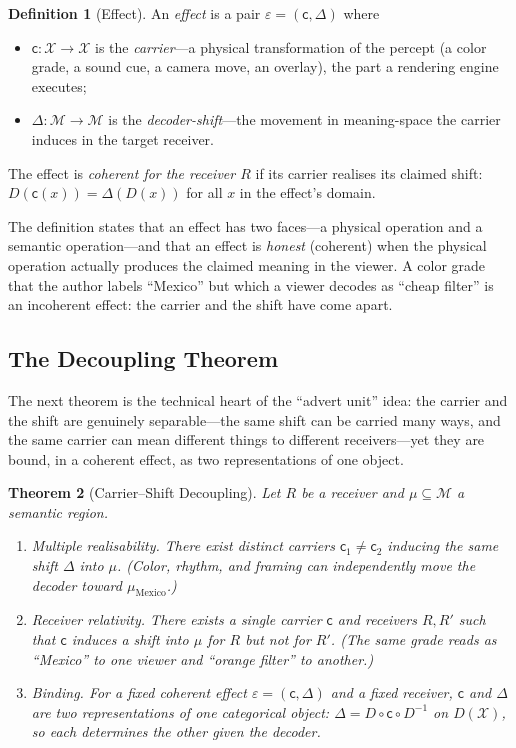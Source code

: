 \documentclass[twocolumn,11pt,a4paper]{article}
\theoremstyle{adv}
\newtheorem{theorem}{Theorem}[section]
\theoremstyle{definition}
\newtheorem{definition}[theorem]{Definition}
\theoremstyle{remark}
\newcommand{\Out}{\mathcal{X}}         %
\newcommand{\Dec}{D}                   %
\newcommand{\Recv}{R}                  %
\newcommand{\Eff}{\varepsilon}        %
\newcommand{\Carrier}{\kappa}         %
\renewcommand{\Carrier}{\mathsf{c}}
\newcommand{\Mean}{\mathcal{M}}        %
\newcommand{\shift}{\Delta}            %
\begin{document}
\begin{definition}[Effect]
\label{def:effect}
An \emph{effect} is a pair $\Eff=(\Carrier,\shift)$ where
\begin{itemize}[leftmargin=1.4em,itemsep=1pt]
\item $\Carrier:\Out\to\Out$ is the \emph{carrier}---a physical
  transformation of the percept (a color grade, a sound cue, a camera
  move, an overlay), the part a rendering engine executes;
\item $\shift:\Mean\to\Mean$ is the \emph{decoder-shift}---the movement in
  meaning-space the carrier induces in the target receiver.
\end{itemize}
The effect is \emph{coherent for the receiver $\Recv$} if its carrier
realises its claimed shift: $\Dec(\Carrier(x))=\shift(\Dec(x))$ for all
$x$ in the effect's domain.
\end{definition}

The definition states that an effect has two faces---a physical operation
and a semantic operation---and that an effect is \emph{honest} (coherent)
when the physical operation actually produces the claimed meaning in the
viewer. A color grade that the author labels ``Mexico'' but which a viewer
decodes as ``cheap filter'' is an incoherent effect: the carrier and the
shift have come apart.

\subsection{The Decoupling Theorem}

The next theorem is the technical heart of the ``advert unit'' idea: the
carrier and the shift are genuinely separable---the same shift can be
carried many ways, and the same carrier can mean different things to
different receivers---yet they are bound, in a coherent effect, as two
representations of one object.

\begin{theorem}[Carrier--Shift Decoupling]
\label{thm:decoupling}
Let $\Recv$ be a receiver and $\mu\subseteq\Mean$ a semantic region.
\begin{enumerate}[label=(\roman*),leftmargin=1.8em,itemsep=2pt]
\item \emph{Multiple realisability.} There exist distinct carriers
  $\Carrier_1\ne\Carrier_2$ inducing the same shift $\shift$ into $\mu$.
  (Color, rhythm, and framing can independently move the decoder toward
  $\mu_{\text{Mexico}}$.)
\item \emph{Receiver relativity.} There exists a single carrier $\Carrier$
  and receivers $\Recv,\Recv'$ such that $\Carrier$ induces a shift into
  $\mu$ for $\Recv$ but not for $\Recv'$. (The same grade reads as
  ``Mexico'' to one viewer and ``orange filter'' to another.)
\item \emph{Binding.} For a fixed coherent effect $\Eff=(\Carrier,\shift)$
  and a fixed receiver, $\Carrier$ and $\shift$ are two representations of
  one categorical object: $\shift=\Dec\circ\Carrier\circ\Dec^{-1}$ on
  $\Dec(\Out)$, so each determines the other given the decoder.
\end{enumerate}
\end{theorem}
\end{document}
